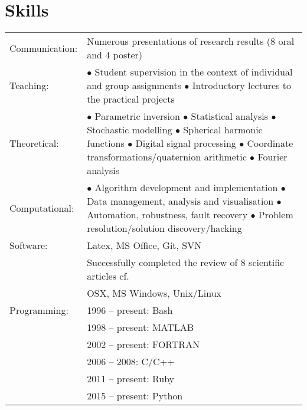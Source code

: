 \documentclass[a4paper]{article}
\newcommand{\dynhref}[2]{%
  \iftoggle{expliciturl}{%
    #2 (\href{#1}{\texttt{\detokenize{#1}}})%
  }{%
    \href{#1}{#2}%
  }%
}
\newcommand{\procv}[2]{\iftoggle{professionalcv}{#1}{#2}}
\newlength{\listskipbig}
\newenvironment{cvsection}[2]{
  \setlength{\floatsep}{0pt}
  \setlength{\textfloatsep}{0pt}
  \setlength{\intextsep}{0pt}
  \section*{#1}
  \begin{longtable}{lp{#2}}
}{
  \end{longtable}
}
\begin{document}
\begin{cvsection}{Skills}{11.2cm}

Communication:  & Numerous presentations of research results (8 oral and 4 poster)\\[\listskipbig]

Teaching:      & $\bullet$ Student supervision in the context of individual and group assignments\newline
                 $\bullet$ Introductory lectures to the practical projects\\[\listskipbig]

Theoretical:   & $\bullet$ Parametric inversion\newline
                 $\bullet$ Statistical analysis\newline
                 $\bullet$ Stochastic modelling\newline
                 $\bullet$ Spherical harmonic functions\newline
                 $\bullet$ Digital signal processing\newline
                 $\bullet$ Coordinate transformations\slash quaternion arithmetic\newline
                 $\bullet$ Fourier analysis\\[\listskipbig]

Computational:  & $\bullet$ Algorithm development and implementation\newline
                  $\bullet$ Data management, analysis and visualisation\newline
                  $\bullet$ Automation, robustness, fault recovery\newline
                  $\bullet$ Problem resolution\slash solution discovery\slash hacking\\[\listskipbig]

Software: & Latex, MS Office, Git, SVN\\[\listskipbig]
\procv{}{
Articles review: & Successfully completed the review of 8 scientific articles cf. \dynhref{https://publons.com/a/782170/}{Publons}\\[\listskipbig]
}

Operating Systems: & OSX, MS Windows, Unix/Linux \\[\listskipbig]

Programming:
& 1996 -- present: Bash \\
& 1998 -- present: MATLAB \\
& 2002 -- present: FORTRAN \\
& 2006 -- 2008: C/C++ \\
& 2011 -- present: Ruby \\
& 2015 -- present: Python\\[\listskipbig]
\end{cvsection}
\end{document}
